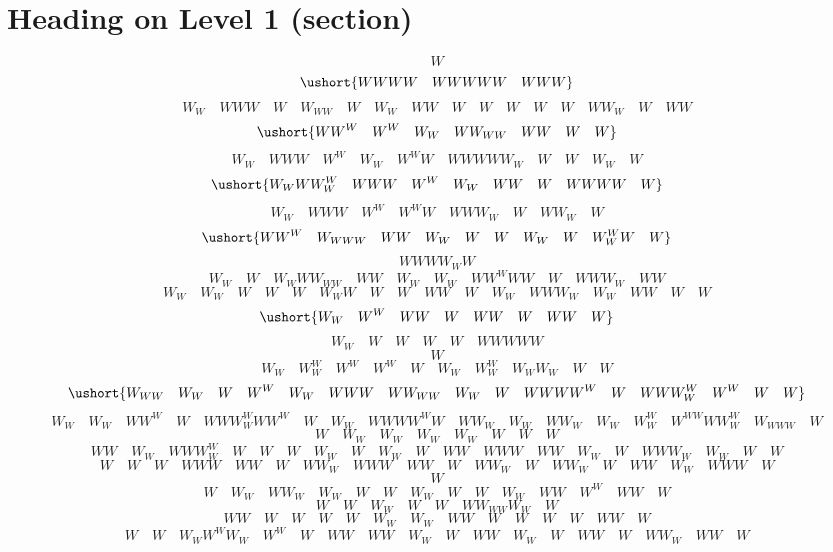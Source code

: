 \documentclass[12pt]{article}
\begin{document}
\section{Heading on Level 1 (section)}
\color{red}\[W\]
\color{orange}\[\ushort{WWWW \quad WWWWW \quad WWW}\]
\color{lime}\[W_{W} \quad WWW \quad W \quad W_{WW} \quad W \quad W_{W} \quad WW \quad W \quad W \quad W \quad W \quad W \quad WW_{W} \quad W \quad WW\]
\color{cyan}\[\ushort{WW^{W} \quad W^{W} \quad W_{W} \quad WW_{WW} \quad WW \quad W \quad W}\]
\color{blue}\[W_{W} \quad WWW \quad W^{W} \quad W_{W} \quad W^{W}W \quad WWWWW_{W} \quad W \quad W \quad W_{W} \quad W\]
\color{red}\[\ushort{W_{W}WW^{W}_{W} \quad WWW \quad W^{W} \quad W_{W} \quad WW \quad W \quad WWWW \quad W}\]
\color{orange}\[W_{W} \quad WWW \quad W^{W} \quad W^{W}W \quad WWW_{W} \quad W \quad WW_{W} \quad W\]
\color{lime}\[\ushort{WW^{W} \quad W_{WWW} \quad WW \quad W_{W} \quad W \quad W \quad W_{W} \quad W \quad W^{W}_{W}W \quad W}\]
\color{cyan}\[WWWW_{W}W\]
\color{blue}\[W_{W} \quad W \quad W_{W}WW_{WW} \quad WW \quad W_{W} \quad W_{W} \quad WW^{W}WW \quad W \quad WWW_{W} \quad WW\]
\color{red}\[W_{W} \quad W_{W} \quad W \quad W \quad W \quad W_{W}W \quad W \quad W \quad WW \quad W \quad W_{W} \quad WWW_{W} \quad W_{W} \quad WW \quad W \quad W\]
\color{orange}\[\ushort{W_{W} \quad W^{W} \quad WW \quad W \quad WW \quad W \quad WW \quad W}\]
\color{lime}\[W_{W} \quad W \quad W \quad W \quad W \quad WWWWW\]
\color{cyan}\[W\]
\color{blue}\[W_{W} \quad W^{W}_{W} \quad W^{W} \quad W^{W} \quad W \quad W_{W} \quad W^{W}_{W} \quad W_{W}W_{W} \quad W \quad W\]
\color{red}\[\ushort{W_{WW} \quad W_{W} \quad W \quad W^{W} \quad W_{W} \quad WWW \quad WW_{WW} \quad W_{W} \quad W \quad WWWW^{W} \quad W \quad WWW^{W}_{W} \quad W^{W} \quad W \quad W}\]
\color{orange}\[W_{W} \quad W_{W} \quad WW^{W} \quad W \quad WWW^{W}_{W}WW^{W} \quad W \quad W_{W} \quad WWWW^{W}W \quad WW_{W} \quad W_{W} \quad WW_{W} \quad W_{W} \quad W^{W}_{W} \quad W^{WW}WW^{W}_{W} \quad W_{WWW} \quad W\]
\color{cyan}\[W \quad W_{W} \quad W_{W} \quad W_{W} \quad W_{W} \quad W \quad W \quad W\]
\color{red}\[WW \quad W_{W} \quad WWW^{W}_{W} \quad W \quad W \quad W \quad W_{W} \quad W \quad W_{W} \quad W \quad WW \quad WWW \quad WW \quad W_{W} \quad W \quad WWW_{W} \quad W_{W} \quad W \quad W\]
\color{orange}\[W \quad W \quad W \quad WWW \quad WW \quad W \quad WW_{W} \quad WWW \quad WW \quad W \quad WW_{W} \quad W \quad WW_{W} \quad W \quad WW \quad W_{W} \quad WWW \quad W\]
\color{lime}\[W\]
\color{cyan}\[W \quad W_{W} \quad WW_{W} \quad W_{W} \quad W \quad W \quad W_{W} \quad W \quad W \quad W_{W} \quad WW \quad W^{W} \quad WW \quad W\]
\color{blue}\[W \quad W \quad W_{W} \quad W \quad W \quad WW_{WW}W_{W} \quad W\]
\color{red}\[WW \quad W \quad W \quad W \quad W \quad W_{W} \quad W_{W} \quad WW \quad W \quad W \quad W \quad W \quad WW \quad W\]
\color{orange}\[W \quad W \quad W_{W}W^{W}W_{W} \quad W^{W} \quad W \quad WW \quad WW \quad W_{W} \quad W \quad WW \quad W_{W} \quad W \quad WW \quad W \quad WW_{W} \quad WW \quad W\]
\end{document}
